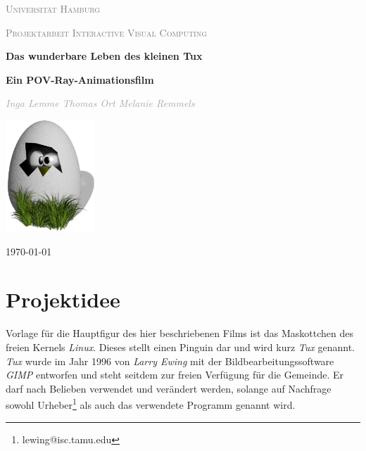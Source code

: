 \documentclass[11pt,parskip]{scrartcl}
\begin{document}
%
\begin{titlepage}
  \begin{sffamily}
    {\scshape\LARGE \textcolor{gray}{Universität Hamburg}\par}
    {\scshape\Large \textcolor{gray}{Projektarbeit Interactive Visual
        Computing}\par}
    \vspace{2.5cm}
    \centering
    {\huge\bfseries Das wunderbare Leben des kleinen Tux\par}
    {\large\bfseries Ein POV-Ray-Animationsfilm\par}
    \vspace{1.5cm}
    {\Large\itshape \textcolor{darkgray}{
        Inga Lemme \quad{}
        Thomas Ort \quad{}
        Melanie Remmels
      }\par
    }
    \vfill
    \includegraphics[width=0.25\textwidth]{./fig/tuxegg}\par\vspace{1cm}
    \vfill
    {\large \today\par}
  \end{sffamily}
\end{titlepage}
%


\newpage
\tableofcontents
\newpage


\section{Projektidee}
Vorlage für die Hauptfigur des hier beschriebenen Films ist das Maskottchen
des freien Kernels \emph{Linux}. Dieses stellt einen Pinguin dar und wird kurz
\emph{Tux} genannt. \emph{Tux} wurde im Jahr 1996 von \emph{Larry Ewing} mit
der Bildbearbeitungssoftware \emph{GIMP} entworfen und steht seitdem zur freien
Verfügung für die Gemeinde. Er darf nach Belieben verwendet und verändert
werden, solange auf Nachfrage sowohl Urheber\footnote{lewing@isc.tamu.edu} als
auch das verwendete Programm genannt wird. \cite{ewing}
\end{document}
